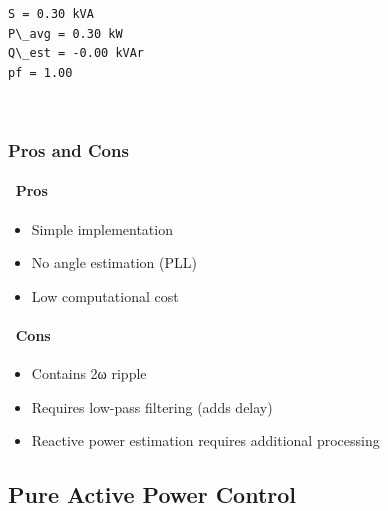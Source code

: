 \documentclass[11pt]{article}
\providecommand{\cmark}{\texorpdfstring{{\color{green!60!black}\ding{51}}\,}{[+] }}
\providecommand{\xmark}{\texorpdfstring{{\color{red}\ding{55}}\,}{[-] }}
\providecommand{\tightlist}{%
      \setlength{\itemsep}{0pt}\setlength{\parskip}{0pt}}
\begin{document}
    \begin{Verbatim}[commandchars=\\\{\}]
S = 0.30 kVA
P\_avg = 0.30 kW
Q\_est = -0.00 kVAr
pf = 1.00
    \end{Verbatim}

    \begin{center}
    \end{center}
    { \hspace*{\fill} \\}
    
    \hypertarget{pros-and-cons-power-calculation}{%
\subsubsection{Pros and Cons}\label{pros-and-cons-power-calculation}}

\hypertarget{pros-power-calculation}{%
\paragraph{\cmark{} Pros}\label{pros-power-calculation}}

\begin{itemize}
\tightlist
\item
  Simple implementation
\item
  No angle estimation (PLL)
\item
  Low computational cost
\end{itemize}

\hypertarget{cons-power-calculation}{%
\paragraph{\xmark{} Cons}\label{cons-power-calculation}}

\begin{itemize}
\tightlist
\item
  Contains 2ω ripple
\item
  Requires low-pass filtering (adds delay)
\item
  Reactive power estimation requires additional processing
\end{itemize}

    \hypertarget{pure-active-power-control}{%
\subsection{Pure Active Power Control}\label{pure-active-power-control}}
\end{document}
